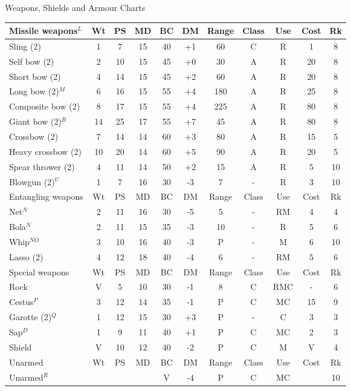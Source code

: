 \begin{Tables}{Weapons, Shields and Armour Charts}
\begin{tabularx}{\linewidth}{Xcccccccccc}
\rowcolor{BurntOrange}
Missile weapons$^L$	& Wt	& PS	& MD	& BC	& DM	& Range	& Class	& Use	& Cost	& Rk	\\ \midrule
Sling (2)		& 1	& 7	& 15	& 40	& +1	& 60	& C	& R	& 1	& 8	\\ \hline
Self bow (2)		& 2	& 10	& 15	& 45	& +0	& 30	& A	& R	& 20	& 8	\\ \hline
Short bow (2)		& 4	& 14	& 15	& 45	& +2	& 60	& A	& R	& 20	& 8	\\ \hline
Long bow (2)$^M$	& 6	& 16	& 15	& 55	& +4	& 180	& A	& R	& 25	& 8	\\ \hline
Composite bow (2)	& 8	& 17	& 15	& 55	& +4	& 225	& A	& R	& 80	& 8	\\ \hline
Giant bow (2)$^B$	& 14	& 25	& 17	& 55	& +7	& 45	& A	& R	& 80	& 8	\\ \hline
Crossbow (2)		& 7	& 14	& 14	& 60	& +3	& 80	& A	& R	& 15	& 5	\\ \hline
Heavy crossbow (2)	& 10	& 20	& 14	& 60	& +5	& 90	& A	& R	& 20	& 5	\\ \hline
Spear thrower (2)	& 4	& 11	& 14	& 50	& +2	& 15	& A	& R	& 5	& 10	\\ \hline
Blowgun (2)$^U$		& 1	& 7	& 16	& 30	& -3	& 7	& -	& R	& 3	& 10	\\ \midrule
\rowcolor{BurntOrange}
Entangling weapons	& Wt	& PS	& MD	& BC	& DM	& Range	& Class	& Use	& Cost	& Rk	\\ \midrule
Net$^N$			& 2	& 11	& 16	& 30	& -5	& 5	& -	& RM	& 4	& 4	\\ \hline
Bola$^N$		& 2	& 11	& 15	& 35	& -3	& 10	& -	& R	& 5	& 6	\\ \hline
Whip$^{NO}$		& 3	& 10	& 16	& 40	& -3	& P	& -	& M	& 6	& 10	\\ \hline
Lasso (2)		& 4	& 12	& 18	& 40	& -4	& 6	& -	& RM	& 5	& 6	\\ \midrule
\rowcolor{BurntOrange}
Special weapons		& Wt	& PS	& MD	& BC	& DM	& Range	& Class	& Use	& Cost	& Rk	\\ \midrule
Rock			& V	& 5	& 10	& 30	& -1	& 8	& C	& RMC	& -	& 6	\\ \hline
Cestus$^P$		& 3	& 12	& 14	& 35	& -1	& P	& C	& MC	& 15	& 9	\\ \hline
Garotte (2)$^Q$		& 1	& 12	& 15	& 30	& +3	& P	& -	& C	& 3	& 3	\\ \hline
Sap$^D$			& 1	& 9	& 11	& 40	& +1	& P	& C	& MC	& 2	& 3	\\ \hline
Shield			& V	& 10	& 12	& 40	& -2	& P	& C	& M	& V	& 4	\\ \midrule
\rowcolor{BurntOrange}
Unarmed			& Wt	& PS	& MD	& BC	& DM	& Range	& Class	& Use	& Cost	& Rk	\\ \midrule
Unarmed$^R$		&	& 	& 	& V	& -4	& P	& C	& MC	& 	& 10	\\ \bottomrule
\end{tabularx}


\end{Tables}
